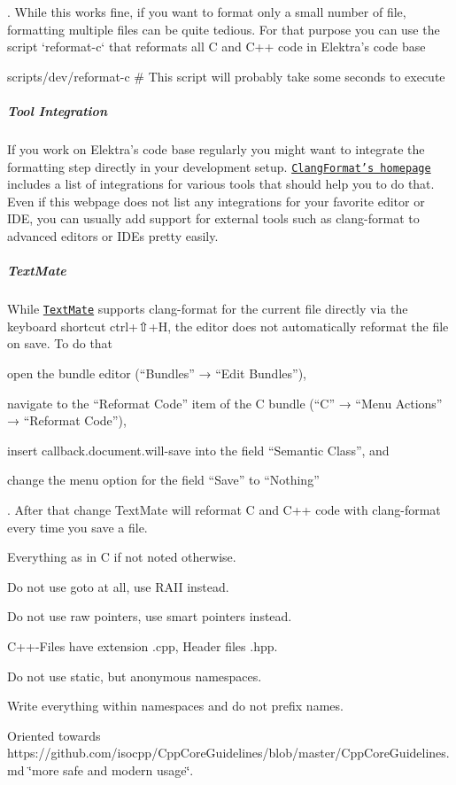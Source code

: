 . While this works fine, if you want to format only a small number of file, formatting multiple files can be quite tedious. For that purpose you can use the script `reformat-\/c` that reformats all C and C++ code in Elektra’s code base


\begin{DoxyCode}
scripts/dev/reformat-c # This script will probably take some seconds to execute
\end{DoxyCode}


\label{invalid_invalid}%
%
\subparagraph*{Tool Integration}

If you work on Elektra’s code base regularly you might want to integrate the formatting step directly in your development setup. \href{https://clang.llvm.org/docs/ClangFormat.html}{\tt Clang\+Format’s homepage} includes a list of integrations for various tools that should help you to do that. Even if this webpage does not list any integrations for your favorite editor or I\+DE, you can usually add support for external tools such as {\ttfamily clang-\/format} to advanced editors or I\+D\+Es pretty easily.

\subparagraph*{Text\+Mate}

While \href{https://macromates.com}{\tt Text\+Mate} supports {\ttfamily clang-\/format} for the current file directly via the keyboard shortcut {\ttfamily ctrl}+{\ttfamily ⇧}+{\ttfamily H}, the editor does not automatically reformat the file on save. To do that


\begin{DoxyEnumerate}
\item open the bundle editor (“\+Bundles” → “\+Edit Bundles”),
\item navigate to the “\+Reformat Code” item of the C bundle (“\+C” → “\+Menu Actions” → “\+Reformat Code”),
\item insert {\ttfamily callback.\+document.\+will-\/save} into the field “\+Semantic Class”, and
\item change the menu option for the field “\+Save” to “\+Nothing”
\end{DoxyEnumerate}

. After that change Text\+Mate will reformat C and C++ code with {\ttfamily clang-\/format} every time you save a file.


\begin{DoxyItemize}
\item Everything as in C if not noted otherwise.
\item Do not use goto at all, use R\+A\+II instead.
\item Do not use raw pointers, use smart pointers instead.
\item C++-\/\+Files have extension {\ttfamily .cpp}, Header files {\ttfamily .hpp}.
\item Do not use {\ttfamily static}, but anonymous namespaces.
\item Write everything within namespaces and do not prefix names.
\item Oriented towards https\+://github.com/isocpp/\+Cpp\+Core\+Guidelines/blob/master/\+Cpp\+Core\+Guidelines.\+md \char`\"{}more safe and modern usage\char`\"{}.
\end{DoxyItemize}

